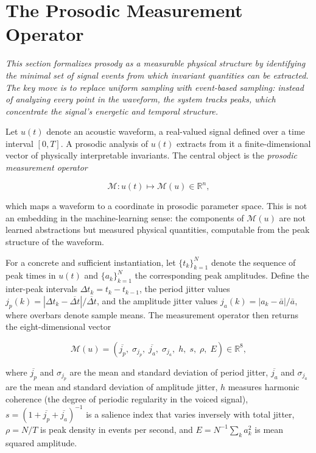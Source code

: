 \documentclass[12pt, a4paper]{article}
\begin{document}
\section{The Prosodic Measurement Operator}

\noindent\textit{This section formalizes prosody as a measurable physical structure by identifying the minimal set of signal events from which invariant quantities can be extracted. The key move is to replace uniform sampling with event-based sampling: instead of analyzing every point in the waveform, the system tracks peaks, which concentrate the signal's energetic and temporal structure.}


Let $u(t)$ denote an acoustic waveform, a real-valued signal defined over a time interval $[0, T]$. A prosodic analysis of $u(t)$ extracts from it a finite-dimensional vector of physically interpretable invariants. The central object is the \emph{prosodic measurement operator}

\begin{equation}
\mathcal{M} : u(t) \mapsto \mathcal{M}(u) \in \mathbb{R}^n,
\label{eq:M}
\end{equation}

which maps a waveform to a coordinate in prosodic parameter space. This is not an embedding in the machine-learning sense: the components of $\mathcal{M}(u)$ are not learned abstractions but measured physical quantities, computable from the peak structure of the waveform.

For a concrete and sufficient instantiation, let $\{t_k\}_{k=1}^N$ denote the sequence of peak times in $u(t)$ and $\{a_k\}_{k=1}^N$ the corresponding peak amplitudes. Define the inter-peak intervals $\Delta t_k = t_k - t_{k-1}$, the period jitter values $j_p(k) = |\Delta t_k - \overline{\Delta t}| / \overline{\Delta t}$, and the amplitude jitter values $j_a(k) = |a_k - \bar{a}| / \bar{a}$, where overbars denote sample means. The measurement operator then returns the eight-dimensional vector

\begin{equation}
\mathcal{M}(u) =
\left(
\overline{j_p},\;
\sigma_{j_p},\;
\overline{j_a},\;
\sigma_{j_a},\;
h,\;
s,\;
\rho,\;
E
\right) \in \mathbb{R}^8,
\label{eq:Mvec}
\end{equation}

where $\overline{j_p}$ and $\sigma_{j_p}$ are the mean and standard deviation of period jitter, $\overline{j_a}$ and $\sigma_{j_a}$ are the mean and standard deviation of amplitude jitter, $h$ measures harmonic coherence (the degree of periodic regularity in the voiced signal), $s = (1 + \overline{j_p} + \overline{j_a})^{-1}$ is a salience index that varies inversely with total jitter, $\rho = N/T$ is peak density in events per second, and $E = N^{-1}\sum_k a_k^2$ is mean squared amplitude.
\end{document}
